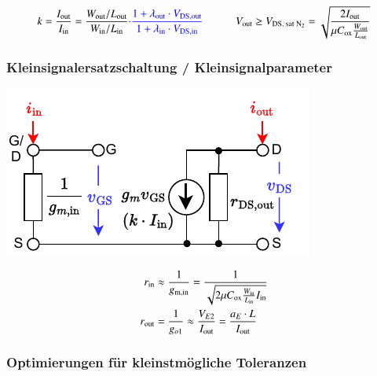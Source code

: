 \vspace{-0.2cm}

\[
    k = \frac{I_\text{out}}{I_\text{in}} = \frac{W_\text{out}/L_\text{out}}{W_\text{in}/L_\text{in}} {\color{blue} \cdot \frac{1 + \lambda_{\rm out} \cdot V_{\rm DS,out}}{1 + \lambda_{\rm in} \cdot V_{\rm DS,in}} }   \qquad \quad
    V_\text{out} \geq V_\text{DS, sat $\text{N}_2$} = \sqrt{\frac{2 I_\text{out}}{\mu C_\text{ox}\frac{W_{\rm out}}{L_{\rm out}}}}
\]

\subsubsection{Kleinsignalersatzschaltung / Kleinsignalparameter}

\vspace{-0.2cm}

\begin{minipage}[t]{0.48\columnwidth}
    \includegraphics[width=\columnwidth, align=t]{images/06_stromspiegel_kleinsignalersatzschaltung.pdf}
\end{minipage}
\hfill
\begin{minipage}[t]{0.48\columnwidth}

    \begin{align*}
        r_{\rm in}  &\approx \frac{1}{g_{\rm m, in}} = \frac{1}{\sqrt{2 \mu C_{\rm ox} \frac{W_{\rm in}}{L_{\rm in}} I_{\rm in}}} \\
        r_{\rm out} &= \frac{1}{g_{o1}} \approx \frac{V_{E2}}{I_{\rm out}} = \frac{a_E \cdot L}{I_{\rm out}}
    \end{align*}
\end{minipage}


\subsubsection{Optimierungen für kleinstmögliche Toleranzen}


